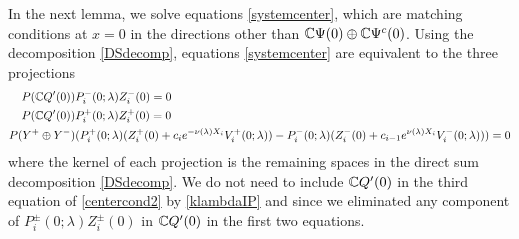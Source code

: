 \documentclass[10pt,reqno]{amsart}
\theoremstyle{plain}
\theoremstyle{definition}
\theoremstyle{remark}
\numberwithin{theorem}{section}
\numberwithin{equation}{section}
\begin{document}
In the next lemma, we solve equations \cref{systemcenter}, which are matching conditions at $x = 0$ in the directions other than $\mathbb{C} \Psi(0) \oplus \mathbb{C} \Psi^c(0)$. Using the decomposition \cref{DSdecomp}, equations \cref{systemcenter} are equivalent to the three projections
\begin{equation}\label{centercond2}
\begin{aligned}
P(\mathbb{C} Q'(0) ) &P_i^-(0; \lambda) Z_i^-(0) = 0 \\
P(\mathbb{C} Q'(0) ) &P_i^+(0; \lambda) Z_i^+(0) = 0 \\
P(Y^+ \oplus Y^-) &( P_i^+(0; \lambda)(Z_i^+(0) + c_i e^{-\nu(\lambda)X_i}V_i^+(0; \lambda)) - P_i^-(0; \lambda) (Z_i^-(0) + c_{i-1} e^{\nu(\lambda)X_i} V_i^-(0; \lambda)) ) = 0
\end{aligned}
\end{equation}
where the kernel of each projection is the remaining spaces in the direct sum decomposition \eqref{DSdecomp}. We do not need to include $\mathbb{C} Q'(0)$ in the third equation of \eqref{centercond2} by \cref{klambdaIP} and since we eliminated any component of $P_i^\pm(0; \lambda) Z_i^\pm(0)$ in $\mathbb{C} Q'(0)$ in the first two equations.
\end{document}
